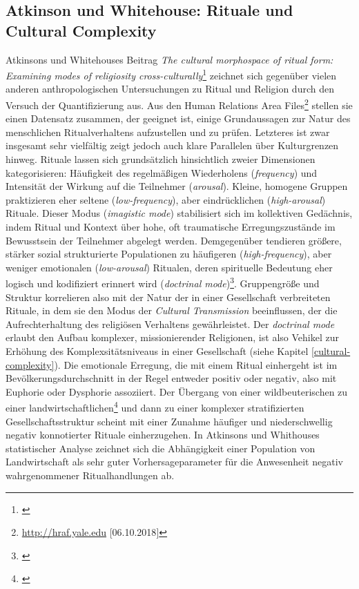 \documentclass[openany,twoside,twocolumn]{book}
\let\rmarkdownfootnote\footnote%
\def\footnote{\protect\rmarkdownfootnote}
\begin{document}
\hypertarget{atkinson-und-whitehouse-rituale-und-cultural-complexity}{%
\subsection{Atkinson und Whitehouse: Rituale und Cultural Complexity}\label{atkinson-und-whitehouse-rituale-und-cultural-complexity}}

Atkinsons und Whitehouses Beitrag \emph{The cultural morphospace of ritual form: Examining modes of religiosity cross-culturally}\footnote{\textcite{atkinson_cultural_2011}} zeichnet sich gegenüber vielen anderen anthropologischen Untersuchungen zu Ritual und Religion durch den Versuch der Quantifizierung aus. Aus den Human Relations Area Files\footnote{\url{http://hraf.yale.edu} {[}06.10.2018{]}} stellen sie einen Datensatz zusammen, der geeignet ist, einige Grundaussagen zur Natur des menschlichen Ritualverhaltens aufzustellen und zu prüfen. Letzteres ist zwar insgesamt sehr vielfältig zeigt jedoch auch klare Parallelen über Kulturgrenzen hinweg. Rituale lassen sich grundsätzlich hinsichtlich zweier Dimensionen kategorisieren: Häufigkeit des regelmäßigen Wiederholens (\emph{frequency}) und Intensität der Wirkung auf die Teilnehmer (\emph{arousal}). Kleine, homogene Gruppen praktizieren eher seltene (\emph{low-frequency}), aber eindrücklichen (\emph{high-arousal}) Rituale. Dieser Modus (\emph{imagistic mode}) stabilisiert sich im kollektiven Gedächnis, indem Ritual und Kontext über hohe, oft traumatische Erregungszustände im Bewusstsein der Teilnehmer abgelegt werden. Demgegenüber tendieren größere, stärker sozial strukturierte Populationen zu häufigeren (\emph{high-frequency}), aber weniger emotionalen (\emph{low-arousal}) Ritualen, deren spirituelle Bedeutung eher logisch und kodifiziert erinnert wird (\emph{doctrinal mode})\footnote{\textcite{whitehouse_modes_2004}}. Gruppengröße und Struktur korrelieren also mit der Natur der in einer Gesellschaft verbreiteten Rituale, in dem sie den Modus der \emph{Cultural Transmission} beeinflussen, der die Aufrechterhaltung des religiösen Verhaltens gewährleistet. Der \emph{doctrinal mode} erlaubt den Aufbau komplexer, missionierender Religionen, ist also Vehikel zur Erhöhung des Komplexsitätsniveaus in einer Gesellschaft (siehe Kapitel \ref{cultural-complexity}). Die emotionale Erregung, die mit einem Ritual einhergeht ist im Bevölkerungsdurchschnitt in der Regel entweder positiv oder negativ, also mit Euphorie oder Dysphorie assoziiert. Der Übergang von einer wildbeuterischen zu einer landwirtschaftlichen\footnote{\textcite{whitehouse_modes_2010}} und dann zu einer komplexer stratifizierten Gesellschaftsstruktur scheint mit einer Zunahme häufiger und niederschwellig negativ konnotierter Rituale einherzugehen. In Atkinsons und Whithouses statistischer Analyse zeichnet sich die Abhängigkeit einer Population von Landwirtschaft als sehr guter Vorhersageparameter für die Anwesenheit negativ wahrgenommener Ritualhandlungen ab.
\end{document}
